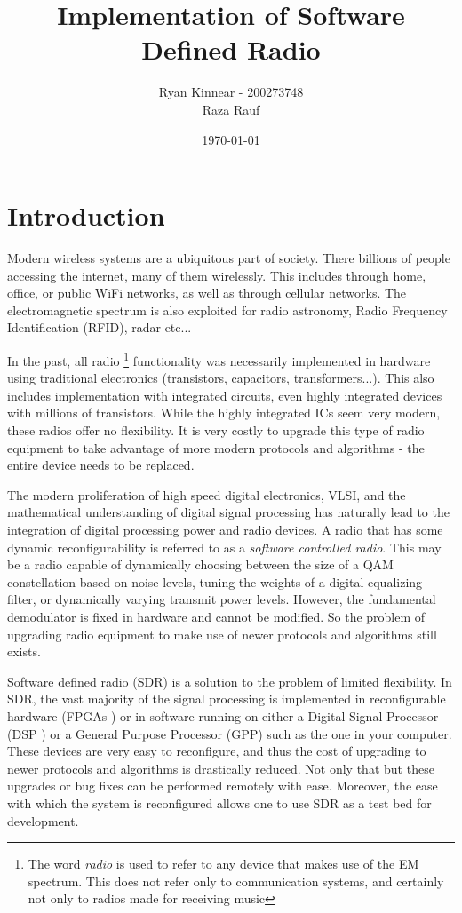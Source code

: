 \documentclass[a4paper, 12pt]{article}
\author{Ryan Kinnear - 200273748 \\ Raza Rauf}
\title{Implementation of Software Defined Radio}
\date{\today}
\begin{document}
\maketitle

\newpage
\tableofcontents
\newpage
\listoffigures
\newpage

\section{Introduction}
\label{sec:intro}
Modern wireless systems are a ubiquitous part of society.  There billions of people accessing the internet, many of them wirelessly.  This includes through home, office, or public WiFi networks, as well as through cellular networks.  The electromagnetic spectrum is also exploited for radio astronomy, Radio Frequency Identification (RFID), radar etc...  

In the past, all radio \footnote{The word \textit{radio} is used to refer to any device that makes use of the EM spectrum.  This does not refer only to communication systems, and certainly not only to radios made for receiving music} functionality was necessarily implemented in hardware using traditional electronics (transistors, capacitors, transformers...).  This also includes implementation with integrated circuits, even highly integrated devices with millions of transistors.  While the highly integrated ICs seem very modern, these radios offer no flexibility.  It is very costly to upgrade this type of radio equipment to take advantage of more modern protocols and algorithms - the entire device needs to be replaced.

The modern proliferation of high speed digital electronics, VLSI, and the mathematical understanding of digital signal processing has naturally lead to the integration of digital processing power and radio devices.  A radio that has some dynamic reconfigurability is referred to as a \textit{software controlled radio}.  This may be a radio capable of dynamically choosing between the size of a QAM constellation based on noise levels, tuning the weights of a digital equalizing filter, or dynamically varying transmit power levels.  However, the fundamental demodulator is fixed in hardware and cannot be modified.  So the problem of upgrading radio equipment to make use of newer protocols and algorithms still exists.

Software defined radio (SDR) is a solution to the problem of limited flexibility.  In SDR, the vast majority of the signal processing is implemented in reconfigurable hardware (FPGAs \cite{fpga_defn}) or in software running on either a Digital Signal Processor (DSP \cite{dsp_defn}) or a General Purpose Processor (GPP) such as the one in your computer.  These devices are very easy to reconfigure, and thus the cost of upgrading to newer protocols and algorithms is drastically reduced.  Not only that but these upgrades or bug fixes can be performed remotely with ease.  Moreover, the ease with which the system is reconfigured allows one to use SDR as a test bed for development.
\end{document}
